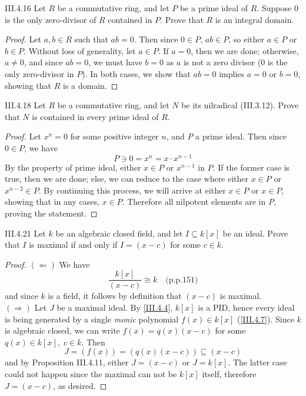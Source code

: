 \begin{problem}{III.4.16}
Let $R$ be a commutative ring, and let $P$ be a prime ideal of $R$. Suppose $0$ is the only zero-divisor of $R$ contained in $P$. Prove that $R$ is an integral domain.
\end{problem}
\begin{proof}
Let $a,b \in R$ such that $ab = 0$. Then since $0 \in P$, $ab \in P$, so either $a\in P$ or $b \in P$. Without loss of generality, let $a \in P$. If $a = 0$, then we are done; otherwise, $a \neq 0$, and since $ab = 0$, we must have $b = 0$ as $a$ is not a zero divisor ($0$ is the only zero-divisor in $P$). In both cases, we show that $ab = 0$ implies $a = 0$ or $b = 0$, showing that $R$ is a domain.
\end{proof}

\begin{problem}{III.4.18}
Let $R$ be a commutative ring, and let $N$ be its nilradical (III.3.12). Prove that $N$ is contained in every prime ideal of $R$.
\end{problem}
\begin{proof}
Let $x^n = 0$ for some positive integer $n$, and $P$ a prime ideal. Then since $0 \in P$, we have
\[
P \ni 0 = x^n = x \cdot x^{n-1}
\]
By the property of prime ideal, either $x \in P$ or $x^{n-1}$ in $P$. If the former case is true, then we are done; else, we can reduce to the case where either $x \in P$ or $x^{n-2} \in P$. By continuing this process, we will arrive at either $x \in P$ or $x \in P$, showing that in any cases, $x \in P$. Therefore all nilpotent elements are in $P$, proving the statement.
\end{proof}

\begin{problem}{III.4.21}
Let $k$ be an algebraic closed field, and let $I \subseteq k[x]$ be an ideal. Prove that $I$ is maximal if and only if $I = (x-c)$ for some $c \in k$.
\end{problem}
\begin{proof}

\noindent $(\Leftarrow)$ We have
\[
\frac{k[x]}{(x-c)} \cong k 	\quad \text{(p.p.151)}
\]
and since $k$ is a field, it follows by definition that $(x-c)$ is maximal. \\
$(\Rightarrow)$ Let $J$ be a maximal ideal. By \ref{III.4.4}, $k[x]$ is a PID, hence every ideal is being generated by a single \emph{monic} polynomial $f(x) \in k[x]$ (\ref{III.4.7}). Since $k$ is algebraic closed, we can write $f(x) = q(x)(x-c)$ for some $q(x) \in k[x],\; c \in k$. Then
\[
J = (f(x)) = (q(x)(x-c)) \subseteq (x-c)
\]
and by Proposition III.4.11, either $J = (x-c)$ or $J = k[x]$. The latter case could not happen since the maximal can not be $k[x]$ itself, therefore $J = (x-c)$, as desired.
\end{proof}

